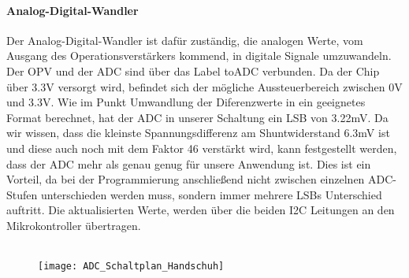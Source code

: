 \documentclass[titlepage,12pt,twoside]{article}
\begin{document}
\paragraph{Analog-Digital-Wandler}
\hfill \break
\hfill \break
Der Analog-Digital-Wandler ist dafür zuständig, die analogen Werte, vom Ausgang des Operationsverstärkers kommend, in digitale 
Signale umzuwandeln. Der OPV und der ADC sind über das Label toADC verbunden. Da der Chip über 3.3V versorgt wird, befindet
sich der mögliche Aussteuerbereich zwischen 0V und 3.3V. Wie im Punkt Umwandlung der Diferenzwerte in ein geeignetes Format berechnet, 
hat der ADC in unserer Schaltung ein LSB von 3.22mV. Da wir wissen, dass die kleinste Spannungsdifferenz am Shuntwiderstand 6.3mV
ist und diese auch noch mit dem Faktor 46 verstärkt wird, kann festgestellt werden, dass der ADC mehr als genau genug für unsere
Anwendung ist. Dies ist ein Vorteil, da bei der Programmierung anschließend nicht zwischen einzelnen ADC-Stufen unterschieden werden
muss, sondern immer mehrere LSBs Unterschied auftritt. Die aktualisierten Werte, werden über die beiden I2C Leitungen an den 
Mikrokontroller übertragen. \\
\\
\begin{figure}[H]
	\begin{center}
		\scalebox{0.5}
		{\texttt{[image: ADC\_Schaltplan\_Handschuh]}}
	\end{center}
\end{figure}
\end{document}
